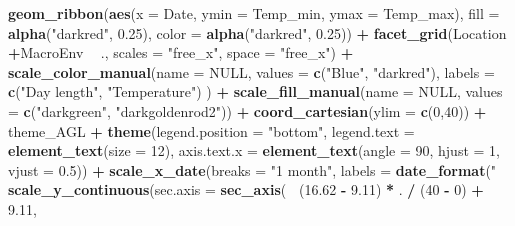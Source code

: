 \documentclass[
]{article}
\newenvironment{Shaded}{\begin{snugshade}}{\end{snugshade}}
\newcommand{\DataTypeTok}[1]{\textcolor[rgb]{0.13,0.29,0.53}{#1}}
\newcommand{\DecValTok}[1]{\textcolor[rgb]{0.00,0.00,0.81}{#1}}
\newcommand{\FloatTok}[1]{\textcolor[rgb]{0.00,0.00,0.81}{#1}}
\newcommand{\KeywordTok}[1]{\textcolor[rgb]{0.13,0.29,0.53}{\textbf{#1}}}
\newcommand{\NormalTok}[1]{#1}
\newcommand{\OperatorTok}[1]{\textcolor[rgb]{0.81,0.36,0.00}{\textbf{#1}}}
\newcommand{\OtherTok}[1]{\textcolor[rgb]{0.56,0.35,0.01}{#1}}
\newcommand{\StringTok}[1]{\textcolor[rgb]{0.31,0.60,0.02}{#1}}
\begin{document}
\begin{Shaded}
\begin{Highlighting}[]
{{{{\StringTok{  }\KeywordTok{geom_ribbon}\NormalTok{(}\KeywordTok{aes}\NormalTok{(}\DataTypeTok{x =}\NormalTok{ Date, }\DataTypeTok{ymin =}\NormalTok{ Temp_min, }\DataTypeTok{ymax =}\NormalTok{ Temp_max),}
              \DataTypeTok{fill =} \KeywordTok{alpha}\NormalTok{(}\StringTok{"darkred"}\NormalTok{, }\FloatTok{0.25}\NormalTok{), }\DataTypeTok{color =} \KeywordTok{alpha}\NormalTok{(}\StringTok{"darkred"}\NormalTok{, }\FloatTok{0.25}\NormalTok{)) }\OperatorTok{+}
\StringTok{  }\KeywordTok{facet_grid}\NormalTok{(Location }\OperatorTok{+}\NormalTok{MacroEnv  }\OperatorTok{~}\StringTok{ }\NormalTok{., }\DataTypeTok{scales =} \StringTok{"free_x"}\NormalTok{, }\DataTypeTok{space =} \StringTok{"free_x"}\NormalTok{) }\OperatorTok{+}
\StringTok{  }\KeywordTok{scale_color_manual}\NormalTok{(}\DataTypeTok{name =} \OtherTok{NULL}\NormalTok{, }\DataTypeTok{values =} \KeywordTok{c}\NormalTok{(}\StringTok{"Blue"}\NormalTok{, }\StringTok{"darkred"}\NormalTok{), }
                    \DataTypeTok{labels =} \KeywordTok{c}\NormalTok{(}\StringTok{"Day length"}\NormalTok{, }\StringTok{"Temperature"}\NormalTok{) ) }\OperatorTok{+}
\StringTok{  }\KeywordTok{scale_fill_manual}\NormalTok{(}\DataTypeTok{name =} \OtherTok{NULL}\NormalTok{, }\DataTypeTok{values =} \KeywordTok{c}\NormalTok{(}\StringTok{"darkgreen"}\NormalTok{, }\StringTok{"darkgoldenrod2"}\NormalTok{)) }\OperatorTok{+}
\StringTok{  }\KeywordTok{coord_cartesian}\NormalTok{(}\DataTypeTok{ylim =} \KeywordTok{c}\NormalTok{(}\DecValTok{0}\NormalTok{,}\DecValTok{40}\NormalTok{)) }\OperatorTok{+}
\StringTok{  }\NormalTok{theme_AGL }\OperatorTok{+}
\StringTok{  }\KeywordTok{theme}\NormalTok{(}\DataTypeTok{legend.position =} \StringTok{"bottom"}\NormalTok{, }
        \DataTypeTok{legend.text =} \KeywordTok{element_text}\NormalTok{(}\DataTypeTok{size =} \DecValTok{12}\NormalTok{),}
        \DataTypeTok{axis.text.x =} \KeywordTok{element_text}\NormalTok{(}\DataTypeTok{angle =} \DecValTok{90}\NormalTok{, }\DataTypeTok{hjust =} \DecValTok{1}\NormalTok{, }\DataTypeTok{vjust =} \FloatTok{0.5}\NormalTok{)) }\OperatorTok{+}
\StringTok{  }\KeywordTok{scale_x_date}\NormalTok{(}\DataTypeTok{breaks =} \StringTok{"1 month"}\NormalTok{, }\DataTypeTok{labels =} \KeywordTok{date_format}\NormalTok{(}\StringTok{"%
\StringTok{  }\KeywordTok{scale_y_continuous}\NormalTok{(}\DataTypeTok{sec.axis =} \KeywordTok{sec_axis}\NormalTok{(}\OperatorTok{~}\StringTok{ }\NormalTok{(}\FloatTok{16.62} \OperatorTok{-}\StringTok{ }\FloatTok{9.11}\NormalTok{) }\OperatorTok{*}\StringTok{ }\NormalTok{. }\OperatorTok{/}\StringTok{ }\NormalTok{(}\DecValTok{40} \OperatorTok{-}\StringTok{ }\DecValTok{0}\NormalTok{) }\OperatorTok{+}\StringTok{ }\FloatTok{9.11}\NormalTok{, }
}}}}}
\end{Highlighting}
\end{Shaded}
\end{document}
